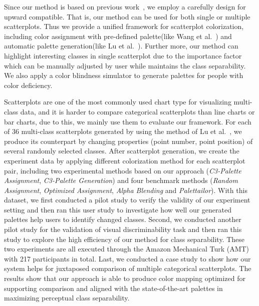 Since our method is based on previous work~\cite{Wang2018, Lu21}, we employ a carefully design for upward compatible. That is, our method can be used for both single or multiple scatterplots. Thus we provide a unified framework for scatterplot colorization, including color assignment with pre-defined palette(like Wang et al.~\cite{Wang2018}) and automatic palette generation(like Lu et al.~\cite{Lu21}). Further more, our method can highlight interesting classes in single scatterplot due to the importance factor which can be manually adjusted by user while maintains the class separability. We also apply a color blindness simulator to generate palettes for people with color deficiency.

Scatterplots are one of the most commonly used chart type for visualizing multi-class data, and it is harder to compare categorical scatterplots than line charts or bar charts, due to this, we mainly use them to evaluate our framework. For each of 36 multi-class scatterplots generated by using the method of Lu et al.~\cite{Lu21}, we produce its counterpart by changing properties (point number, point position) of several randomly selected classes. After scatterplot generation, we create the experiment data by applying different colorization method for each scatterplot pair, including two experimental methods based on our approach (\emph{C3-Palette Assignment}, \emph{C3-Palette Generation}) and four benchmark methods (\emph{Random Assignment}, \emph{Optimized Assignment}, \emph{Alpha Blending} and \emph{Palettailor}). With this dataset, we first conducted a pilot study to verify the validity of our experiment setting and then ran this user study to investigate how well our generated palettes help users to identify changed classes.
Second, we conducted another pilot study for the validation of visual discriminability task and then ran this study to explore the high efficiency of our method for class separability.
These two experiments are all executed through the Amazon Mechanical Turk (AMT) with 217 participants in total.
Last, we conducted a case study to show how our system helps for juxtaposed comparison of multiple categorical scatterplots.
The results show that our approach is able to produce color mapping optimized for supporting comparison and aligned with the state-of-the-art palettes in maximizing perceptual class separability.

